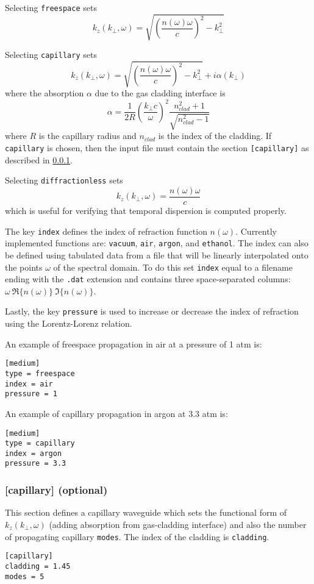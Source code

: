\documentclass{article}
\begin{document}
Selecting \texttt{freespace} sets
\[k_z(k_\perp,\omega) = \sqrt{\left(\frac{n(\omega)\omega}{c}\right)^2 - k_\perp^2}\]

Selecting \texttt{capillary} sets
\[k_z(k_\perp,\omega) = \sqrt{\left(\frac{n(\omega)\omega}{c}\right)^2 - k_\perp^2} + i\alpha(k_\perp)\]
where the absorption $\alpha$ due to the gas cladding interface is
\[\alpha = \frac{1}{2R}\left(\frac{k_\perp c}{\omega}\right)^2 \frac{n_{clad}^2+1}{\sqrt{n_{clad}^2 -1}}\]
where $R$ is the capillary radius and $n_{clad}$ is the index of the
cladding. If \texttt{capillary} is chosen, then the input file must
contain the section \texttt{[capillary]} as described in
\ref{sec:capillary}.

Selecting \texttt{diffractionless} sets
\[k_z(k_\perp,\omega) = \frac{n(\omega)\omega}{c}\] which is useful
for verifying that temporal dispersion is computed properly.

The key \texttt{index} defines the index of refraction function
$n(\omega)$. Currently implemented functions are: \texttt{vacuum},
\texttt{air}, \texttt{argon}, and \texttt{ethanol}. The index can also
be defined using tabulated data from a file that will be linearly
interpolated onto the points $\omega$ of the spectral domain. To do
this set \texttt{index} equal to a filename ending with the
\texttt{.dat} extension and contains three space-separated columns:
$\omega~\Re\{n(\omega)\}~\Im\{n(\omega)\}$.

Lastly, the key \texttt{pressure} is used to increase or decrease the
index of refraction using the Lorentz-Lorenz relation.

An example of freespace propagation in air at a pressure of 1 atm is:
\begin{lstlisting}
[medium]
type = freespace
index = air
pressure = 1
\end{lstlisting}

An example of capillary propagation in argon at 3.3 atm is:
\begin{lstlisting}
[medium]
type = capillary
index = argon
pressure = 3.3
\end{lstlisting}

\subsubsection{[capillary] (optional)}
\label{sec:capillary}
This section defines a capillary waveguide which sets the functional
form of $k_z(k_\perp,\omega)$ (adding absorption from gas-cladding
interface) and also the number of propagating capillary
\texttt{modes}. The index of the cladding is \texttt{cladding}.
\begin{lstlisting}
[capillary]
cladding = 1.45
modes = 5
\end{lstlisting}
\end{document}
